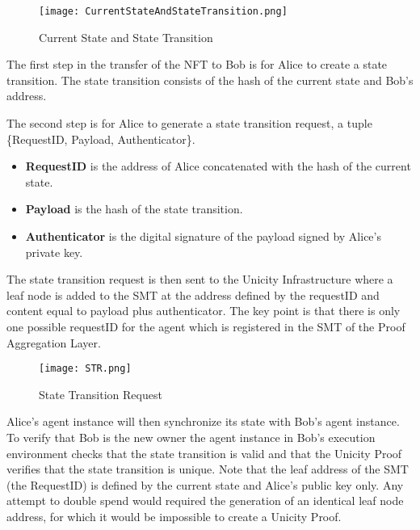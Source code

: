 \documentclass{article}
\begin{document}
\begin{figure}[htbp]
    \centering
    \texttt{[image: CurrentStateAndStateTransition.png]}
    \caption{Current State and State Transition}
    \label{fig:CurrentState}
\end{figure}

\vspace{2mm}

The first step in the transfer of the NFT to Bob is for Alice to create a state transition. The state transition consists of the hash of the current state and Bob's address. 

\vspace{2mm}
The second step is for Alice to generate a state transition request, a tuple \{RequestID, Payload, Authenticator\}.

\begin{itemize}
\setlength{\leftmargin}{1em}
 \item  \textbf{RequestID} is the address of Alice concatenated with the hash of the current state.
 \item \textbf{Payload} is the hash of the state transition. 
 \item \textbf{Authenticator} is the digital signature of the payload signed by Alice’s private key.
\end{itemize}

The state transition request is then sent to the Unicity Infrastructure where a leaf node is added to the SMT at the address defined by the requestID and content equal to payload plus authenticator. The key point is that there is only one possible requestID for the agent which is registered in the SMT of the Proof Aggregation Layer.

\begin{figure}[H]
    \centering
    \texttt{[image: STR.png]}
    \caption{State Transition Request}
    \label{fig:STR}
\end{figure}




Alice's agent instance will then synchronize its state with Bob's agent instance. To verify that Bob is the new owner the agent instance in Bob's execution environment checks that the state transition is valid and that the Unicity Proof verifies that the state transition is unique. Note that the leaf address of the SMT (the RequestID) is defined by the current state and Alice’s public key only.  Any attempt to double spend would required the generation of an identical leaf node address, for which it would be impossible to create a Unicity Proof.
\end{document}
